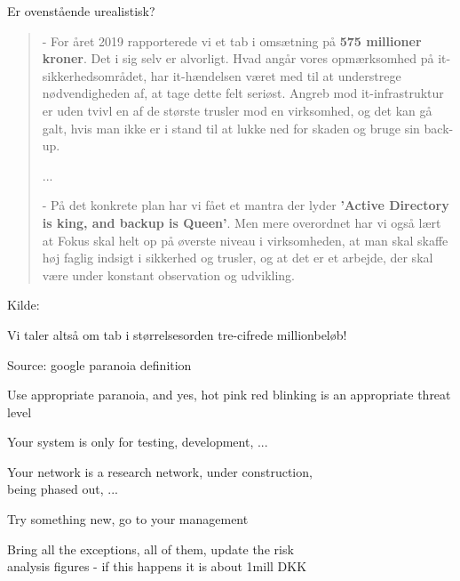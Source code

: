 \documentclass[Screen16to9,17pt]{foils}
\begin{document}
\begin{list2}
\item Er ovenstående urealistisk?
\end{list2}



\begin{quote}
- For året 2019 rapporterede vi et tab i omsætning på {\bf 575 millioner kroner}. Det i sig selv er alvorligt. Hvad angår vores opmærksomhed på it-sikkerhedsområdet, har it-hændelsen været med til at understrege nødvendigheden af, at tage dette felt seriøst. Angreb mod it-infrastruktur er uden tvivl en af de største trusler mod en virksomhed, og det kan gå galt, hvis man ikke er i stand til at lukke ned for skaden og bruge sin back-up.

...

- På det konkrete plan har vi fået et mantra der lyder {\bf ’Active Directory is king, and backup is Queen’}. Men mere overordnet har vi også lært at Fokus skal helt op på øverste niveau i virksomheden, at man skal skaffe høj faglig indsigt i sikkerhed og trusler, og at det er et arbejde, der skal være under konstant observation og udvikling.

\end{quote}
Kilde: 


\begin{list2}
\item Vi taler altså om tab i størrelsesorden tre-cifrede millionbeløb!
\end{list2}



Source: google paranoia definition

Use appropriate paranoia, and yes, hot pink red blinking is an appropriate threat level



Your system is only for testing, development, ...

Your network is a research network, under construction, \\
being phased out, ...

Try something new, go to your management

Bring all the exceptions, all of them, update the risk \\
analysis figures - if this happens it is about 1mill DKK
\end{document}
